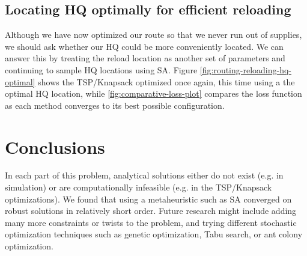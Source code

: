 \documentclass[a0,final]{a0poster}
\begin{document}
\begin{multicols}{3}
\vspace{-15mm}

\subsection*{Locating HQ optimally for efficient reloading}

\vspace{-6mm}

Although we have now optimized our route so that we never run out of supplies, we should ask whether our HQ could be more conveniently located. We can answer this by treating the reload location as another set of parameters and continuing to sample HQ locations using SA. Figure \ref{fig:routing-reloading-hq-optimal} shows the TSP/Knapsack optimized once again, this time using a the optimal HQ location, while \ref{fig:comparative-loss-plot} compares the loss function as each method converges to its best possible configuration.

\vspace{-6mm}

\section*{Conclusions}

\vspace{-6mm}

In each part of this problem, analytical solutions either do not exist (e.g. in simulation) or are computationally infeasible (e.g. in the TSP/Knapsack optimizations).  We found that using a metaheuristic such as SA converged on robust solutions in relatively short order.  Future research might include adding many more constraints or twists to the problem, and trying different stochastic optimization techniques such as genetic optimization, Tabu search, or ant colony optimization.

\vspace{-6mm}




\end{multicols}
\end{document}
